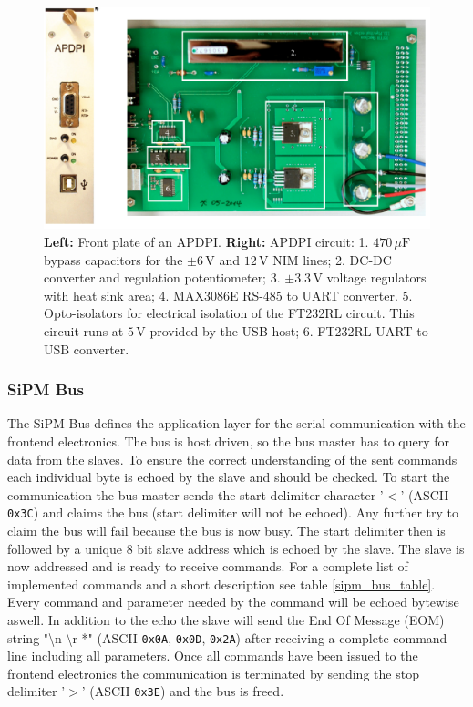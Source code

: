 	\begin{figure}[t]
		\centering
			\includegraphics[width=1.0\textwidth]{Figures/weinstock/apdpi.png}
		\caption{\textbf{Left:} Front plate of an APDPI. \textbf{Right:} APDPI circuit: 1. $470\,\mu \text{F}$ bypass capacitors for the $\pm6\,\text{V}$ and $12\,\text{V}$ 
												   NIM lines;
												2. DC-DC converter and regulation potentiometer;
												3. $\pm3.3\,\text{V}$ voltage regulators with heat sink area;
												4. MAX3086E RS-485 to UART converter.
												5. Opto-isolators for electrical isolation of the FT232RL circuit. This circuit runs
												at $5\,\text{V}$ provided by the USB host;
												6. FT232RL UART to USB converter.}
		\label{APDPI_front}
	\end{figure}	

\subsubsection{SiPM Bus}

The SiPM Bus defines the application layer for the serial communication with the frontend electronics. The bus is host driven, so the bus master has to query for data from the slaves.
To ensure the correct understanding of the sent commands each individual byte is echoed by the slave and should be checked. To start the communication the bus master sends the start
delimiter character '$<$' (ASCII \verb|0x3C|) and claims the bus (start delimiter will not be echoed). Any further try to claim the bus will fail because the bus is now busy. 
The start delimiter then is followed by a unique 8 bit slave address which is echoed by the slave. The slave is now addressed and is ready to receive commands. For a complete list of
implemented commands and a short description see table \ref{sipm_bus_table}. Every command and parameter needed by the command will be echoed bytewise aswell. In addition to the echo 
the slave will send the End Of Message (EOM) string "\textbackslash n \textbackslash r *" (ASCII \verb|0x0A|, \verb|0x0D|, \verb|0x2A|) after receiving a complete command line including all parameters. Once all commands have been issued to the frontend electronics the communication is terminated by sending the stop delimiter '$>$' (ASCII \verb|0x3E|) and the bus is freed. 

